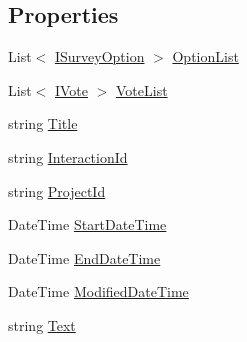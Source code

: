 \subsection*{Properties}
\begin{DoxyCompactItemize}
\item 
List$<$ \hyperlink{interface_plex_byte_1_1_mo_cap_1_1_interactions_1_1_i_survey_option}{I\+Survey\+Option} $>$ \hyperlink{class_plex_byte_1_1_mo_cap_1_1_interactions_1_1_survey_adacfcf5546425c676756bd12772cb4e2}{Option\+List}
\item 
List$<$ \hyperlink{interface_plex_byte_1_1_mo_cap_1_1_interactions_1_1_i_vote}{I\+Vote} $>$ \hyperlink{class_plex_byte_1_1_mo_cap_1_1_interactions_1_1_survey_a3527ea8b21abf85da934d6940a97d2ea}{Vote\+List}
\item 
string \hyperlink{class_plex_byte_1_1_mo_cap_1_1_interactions_1_1_survey_a590e6dd00026c7c039fd61e3166b7170}{Title}
\item 
string \hyperlink{class_plex_byte_1_1_mo_cap_1_1_interactions_1_1_survey_a8d9364d1707414404e0056c269c37697}{Interaction\+Id}
\item 
string \hyperlink{class_plex_byte_1_1_mo_cap_1_1_interactions_1_1_survey_afebba71a8a4961e1cc28c18ad42b7c98}{Project\+Id}
\item 
Date\+Time \hyperlink{class_plex_byte_1_1_mo_cap_1_1_interactions_1_1_survey_a890e2c1421c46175b9fb9af925b57ecf}{Start\+Date\+Time}
\item 
Date\+Time \hyperlink{class_plex_byte_1_1_mo_cap_1_1_interactions_1_1_survey_ad848704707f53e6e58a081dea98c4072}{End\+Date\+Time}
\item 
Date\+Time \hyperlink{class_plex_byte_1_1_mo_cap_1_1_interactions_1_1_survey_adcfad739d1a4acf70ed60a035716f1d1}{Modified\+Date\+Time}
\item 
string \hyperlink{class_plex_byte_1_1_mo_cap_1_1_interactions_1_1_survey_ade12b9b3a140efb18dd061665b40224d}{Text}

\end{DoxyCompactItemize}
